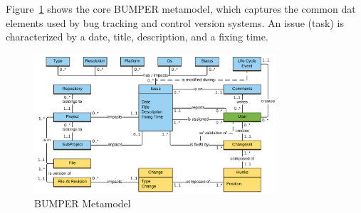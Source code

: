 \documentclass[conference]{IEEEtran}
\begin{document}
Figure~\ref{fig:bumper-metamodel}  shows the core BUMPER metamodel, which captures the common dat elements used by bug tracking and control version systems.
An issue (task) is characterized by a date, title, description, and a fixing time.

\begin{figure}
  \centering
  \includegraphics[width=0.8\textwidth]{media/Bumper-Model.png}
  \caption{BUMPER Metamodel\label{fig:bumper-metamodel}}
\end{figure}
\end{document}
